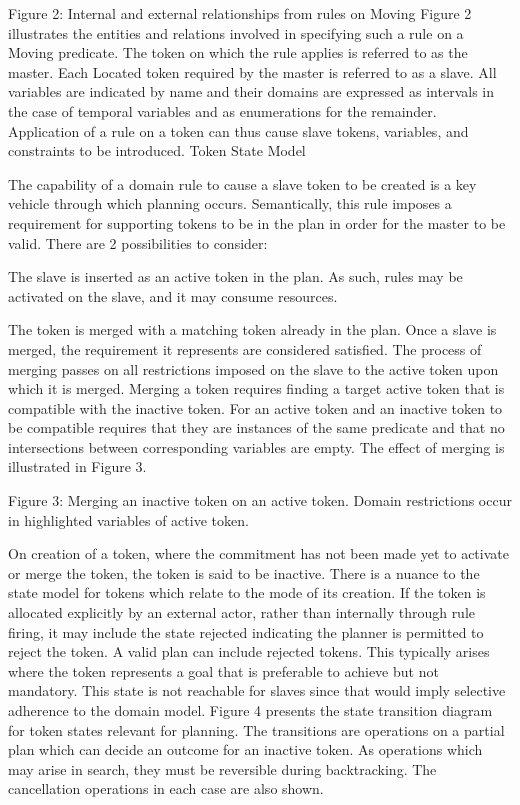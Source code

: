 Figure 2: Internal and external relationships from rules on Moving
Figure 2 illustrates the entities and relations involved in specifying
such a rule on a Moving predicate. The token on which the rule applies
is referred to as the master. Each Located token required by the
master is referred to as a slave. All variables are indicated by name
and their domains are expressed as intervals in the case of temporal
variables and as enumerations for the remainder. Application of a rule
on a token can thus cause slave tokens, variables, and constraints to
be introduced.  Token State Model

The capability of a domain rule to cause a slave token to be created
is a key vehicle through which planning occurs. Semantically, this
rule imposes a requirement for supporting tokens to be in the plan in
order for the master to be valid. There are 2 possibilities to
consider:

The slave is inserted as an active token in the plan. As such, rules
may be activated on the slave, and it may consume resources.

The token is merged with a matching token already in the plan. Once a
slave is merged, the requirement it represents are considered
satisfied. The process of merging passes on all restrictions imposed
on the slave to the active token upon which it is merged. Merging a
token requires finding a target active token that is compatible with
the inactive token. For an active token and an inactive token to be
compatible requires that they are instances of the same predicate and
that no intersections between corresponding variables are empty. The
effect of merging is illustrated in Figure 3.

Figure 3: Merging an inactive token on an active token. Domain
restrictions occur in highlighted variables of active token.

On creation of a token, where the commitment has not been made yet to
activate or merge the token, the token is said to be inactive. There
is a nuance to the state model for tokens which relate to the mode of
its creation. If the token is allocated explicitly by an external
actor, rather than internally through rule firing, it may include the
state rejected indicating the planner is permitted to reject the
token. A valid plan can include rejected tokens. This typically arises
where the token represents a goal that is preferable to achieve but
not mandatory. This state is not reachable for slaves since that would
imply selective adherence to the domain model. Figure 4 presents the
state transition diagram for token states relevant for planning. The
transitions are operations on a partial plan which can decide an
outcome for an inactive token. As operations which may arise in
search, they must be reversible during backtracking. The cancellation
operations in each case are also shown.

